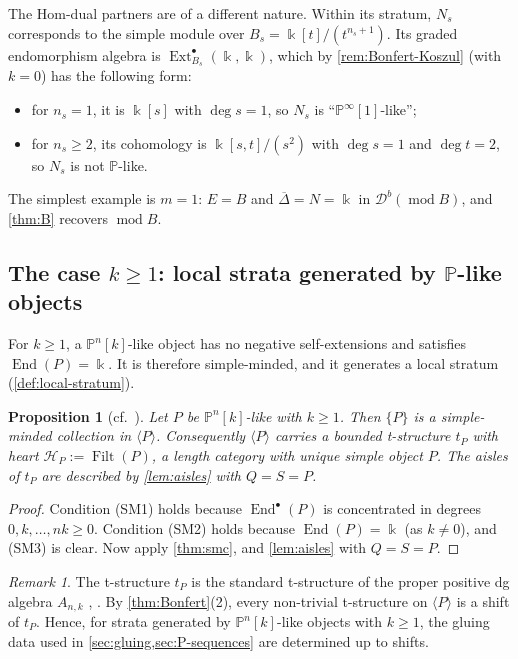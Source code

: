 \documentclass[11pt,reqno]{amsart}
\theoremstyle{plain}
\newtheorem{proposition}[theorem]{Proposition}
\theoremstyle{definition}
\theoremstyle{remark}
\newtheorem{remark}[theorem]{Remark}
\newcommand{\kk}{\Bbbk}
\DeclareMathOperator{\End}{End}
\DeclareMathOperator{\Ext}{Ext}
\DeclareMathOperator{\Filt}{Filt}
\newcommand{\modd}{\operatorname{mod}}
\newcommand{\Db}{\mathcal{D}^b}
\newcommand{\thick}[1]{\langle #1\rangle}
\newcommand{\Pn}[2]{\mathbb{P}^{#1}[#2]}
\newcommand{\Deltabar}{\overline{\Delta}}
\newcommand{\cH}{\mathcal{H}}
\begin{document}
The Hom-dual partners are of a different nature. Within its stratum, $N_s$ corresponds to the simple module over $B_s=\kk[t]/(t^{n_s+1})$. Its graded endomorphism algebra is $\Ext^\bullet_{B_s}(\kk,\kk)$, which by \cref{rem:Bonfert-Koszul} (with $k=0$) has the following form:
\begin{itemize}
\item for $n_s=1$, it is $\kk[s]$ with $\deg s=1$, so $N_s$ is ``$\Pn\infty1$-like'';
\item for $n_s\ge2$, its cohomology is $\kk[s,t]/(s^2)$ with $\deg s=1$ and $\deg t=2$, so $N_s$ is not $\mathbb{P}$-like.
\end{itemize}
The simplest example is $m=1$: $E=B$ and $\Deltabar=N=\kk$ in $\Db(\modd B)$, and \cref{thm:B} recovers $\modd B$.


\subsection{The case \texorpdfstring{$k\ge1$}{k>=1}: local strata generated by \texorpdfstring{$\mathbb{P}$}{P}-like objects}\label{sec:P-positive}

For $k\ge1$, a $\Pn nk$-like object has no negative self-extensions and satisfies $\End(P)=\kk$. It is therefore simple-minded, and it generates a local stratum (\cref{def:local-stratum}).


\begin{proposition}[{cf.\ \cite[\S3.2]{Bonf26}}]\label{prop:tP}
Let $P$ be $\Pn nk$-like with $k\ge1$. Then $\{P\}$ is a simple-minded collection in $\thick P$. Consequently $\thick P$ carries a bounded t-structure $t_P$ with heart $\cH_P:=\Filt(P)$, a length category with unique simple object $P$. The aisles of $t_P$ are described by \cref{lem:aisles} with $Q=S=P$.
\end{proposition}

\begin{proof}
Condition (SM1) holds because $\End^\bullet(P)$ is concentrated in degrees $0,k,\dots,nk\ge0$. Condition (SM2) holds because $\End(P)=\kk$ (as $k\ne0$), and (SM3) is clear. Now apply \cref{thm:smc}, and \cref{lem:aisles} with $Q=S=P$.
\end{proof}

\begin{remark}\label{rem:tP-unique}
The t-structure $t_P$ is the standard t-structure of the proper positive dg algebra $A_{n,k}$ \cite[Thm.~7.1]{KN13}, \cite[\S3.2]{Bonf26}. By \cref{thm:Bonfert}(2), every non-trivial t-structure on $\thick P$ is a shift of $t_P$. Hence, for strata generated by $\Pn nk$-like objects with $k\ge1$, the gluing data used in \cref{sec:gluing,sec:P-sequences} are determined up to shifts.
\end{remark}
\end{document}
